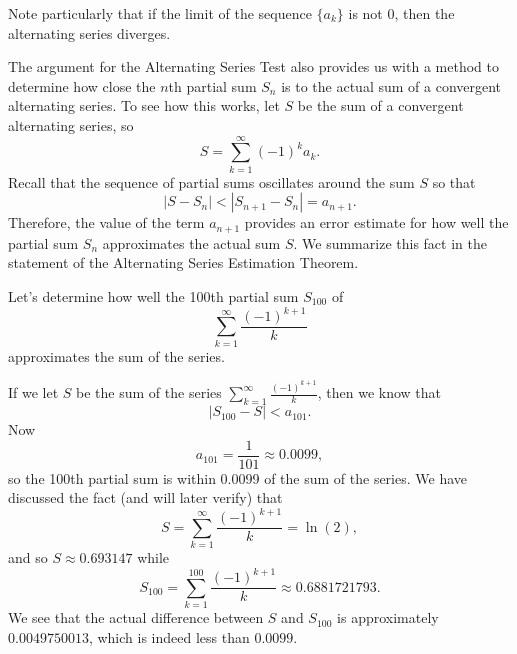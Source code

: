 \vspace*{5pt}
\nin {}
\vspace*{1pt}

Note particularly that if the limit of the sequence $\{a_k\}$ is not 0, then the alternating series diverges.



The argument for the Alternating Series Test also provides us with a method to determine how close the $n$th partial sum $S_n$ is to the actual sum of a convergent alternating series. To see how this works, let $S$ be the sum of a convergent alternating series, so
\[S = \sum_{k=1}^{\infty} (-1)^k a_k.\]
Recall that the sequence of partial sums oscillates around the sum $S$ so that
\[\left|S - S_n \right| < \left| S_{n+1} - S_n \right| = a_{n+1}.\]
Therefore, the value of the term $a_{n+1}$ provides an error estimate for how well the partial sum $S_n$ approximates the actual sum $S$. We summarize this fact in the statement of the Alternating Series Estimation Theorem. 

\vspace*{5pt}
\nin {}
\vspace*{1pt}

\noindent

\bex \label{Ex:8.4.1}
Let's determine how well the 100th partial sum $S_{100}$ of
\[\sum_{k=1}^{\infty} \frac{(-1)^{k+1}}{k}\]
approximates the sum of the series.
\eex

If we let $S$ be the sum of the series $ \sum_{k=1}^{\infty} \frac{(-1)^{k+1}}{k}$, then we know that
\[\left| S_{100} - S \right| < a_{101}.\]
Now
\[a_{101} = \frac{1}{101} \approx 0.0099,\]
so the 100th partial sum is within 0.0099 of the sum of the series. We have discussed the fact (and will later verify) that
\[S = \sum_{k=1}^{\infty} \frac{(-1)^{k+1}}{k} = \ln(2),\]
and so $S \approx 0.693147$ while
\[S_{100} = \sum_{k=1}^{100} \frac{(-1)^{k+1}}{k} \approx 0.6881721793.\]
We see that the actual difference between $S$ and $S_{100}$ is approximately $0.0049750013$, which is indeed less than $0.0099$.
\afterex

